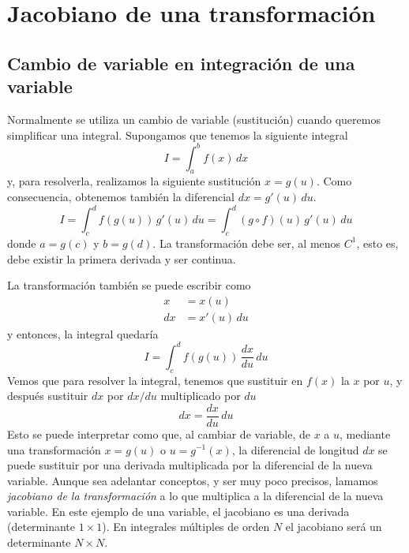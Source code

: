 %

\chapter{Jacobiano de una transformación}
\section{Cambio de variable en integración de una variable}
Normalmente se utiliza un cambio de variable (sustitución) cuando queremos simplificar
una integral.
Supongamos que tenemos la siguiente integral
\begin{equation}
  I= \int_a^b \!f(x)\, dx
\end{equation}
y, para resolverla, realizamos la siguiente sustitución $x = g(u)$.
Como consecuencia, obtenemos también la diferencial $dx=g'(u)\,du$.
\begin{equation}
  I = \int_c^d \!f(g(u))\,g'(u)\,du = \int_c^d\!(g\circ f)(u)\,g'(u)\,du
\end{equation}
donde $a=g(c)$ y $b=g(d)$. La transformación debe ser, al menos $C^1$, esto es, debe
existir la primera derivada y ser continua.

La transformación también se puede escribir como
\begin{align}
  x &= x(u)\\
  dx &= x'(u)\,du
\end{align}
y entonces, la integral quedaría
\begin{equation}
  I = \int_c^d\!f(g(u))\,\dfrac{dx}{du}\,du
\end{equation}
Vemos que para resolver la integral, tenemos que sustituir en $f(x)$ la $x$ por $u$, y
después sustituir $dx$ por $dx/du$ multiplicado por $du$
\begin{equation}
  dx = \dfrac{dx}{du}\,du
\end{equation}
Esto se puede interpretar como que, al cambiar de variable, de $x$ a $u$, mediante una
transformación $x=g(u)$ o $u=g^{-1}(x)$, la diferencial de longitud $dx$ se puede
sustituir por una derivada multiplicada por la diferencial de la nueva variable.
Aunque sea adelantar conceptos, y ser muy poco precisos, lamamos
\emph{jacobiano de la transformación} a lo que multiplica a la diferencial de la nueva
variable.
En este ejemplo de una variable, el jacobiano es una derivada (determinante $1\times 1$).
En integrales múltiples de orden $N$ el jacobiano será un determinante $N\times N$.





